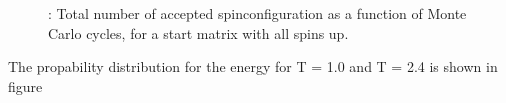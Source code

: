 \documentclass{article}
\begin{document}
{{\begin{figure}
\caption{: Total number of accepted spinconfiguration as a function of Monte Carlo cycles, for a start matrix with all spins up. }
\label{fig:flips_random}
\end{figure}


The propability distribution for the energy for T = 1.0 and T = 2.4 is shown in figure

}}
\end{document}
